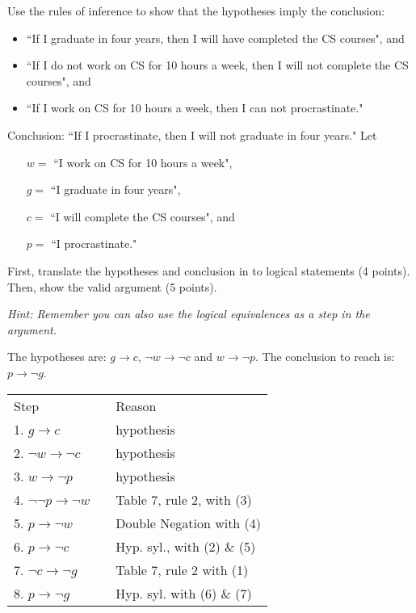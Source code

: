 \documentclass[12pt,addpoints]{exam}
\newcommand{\ra}{\rightarrow}
\begin{document}
\begin{questions}
\question[9]\label{probc} Use the rules of inference to show that the hypotheses imply the conclusion:
\begin{itemize}[itemsep=0pt,parsep=0pt,topsep=0pt,partopsep=0pt]
    \item ``If I graduate in four years, then I will have completed the CS courses", and
    \item ``If I do not work on CS for 10 hours a week, then I will not complete the CS courses", and
    \item ``If I work on CS for 10 hours a week, then I can not procrastinate."
\end{itemize}
Conclusion: ``If I procrastinate, then I will not graduate in four years."
Let
\begin{itemize}[itemsep=0pt,parsep=0pt,topsep=0pt,partopsep=0pt]
    \item[$w = $] ``I work on CS for 10 hours a week",
    \item[$g = $] ``I graduate in four years",
    \item[$c = $] ``I will complete the CS courses", and
    \item[$p = $] ``I procrastinate."
\end{itemize}
First, translate the hypotheses and conclusion in to logical statements (4 points).  Then, show the valid argument (5 points).

\textit{Hint: Remember you can also use the logical equivalences as a step in the argument.}
    \ifprintanswers
        \vspace{-12pt}
    \fi
\begin{solution}
    The hypotheses are: $g \ra c$, $\neg w \ra \neg c$ and $w \ra \neg p$.
    The conclusion to reach is: $p \ra \neg g$.

    \begin{tabular}{lll}
        Step    & \hspace{0.2in} & Reason \\
        1. $g \ra c$           			& & hypothesis \\
        2. $\neg w \ra \neg c$          & & hypothesis \\
        3. $w \ra \neg p$           	& & hypothesis \\
        4. $\neg \neg p \ra \neg w$ 	& & Table 7, rule 2, with (3) \\
        5. $p \ra \neg w$				& & Double Negation with (4) \\
        6. $p \ra \neg c$               & & Hyp. syl., with (2) \& (5) \\
        7. $\neg c \ra \neg g$          & & Table 7, rule 2 with (1) \\
        8. $p \ra \neg g$				& & Hyp. syl. with (6) \& (7)
    \end{tabular}
    

\end{solution}
\end{questions}
\end{document}
